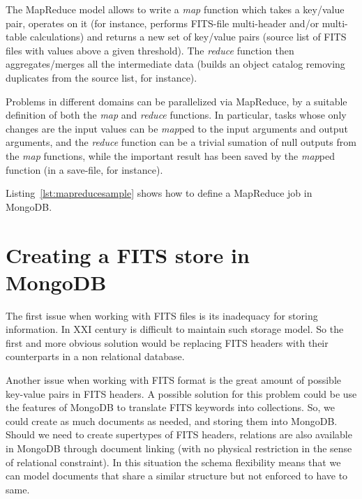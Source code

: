 The MapReduce model allows to write a \emph{map} function which takes a key/value pair, operates on it
(for instance, performs FITS-file multi-header and/or multi-table calculations)
and returns a new set of key/value pairs
(source list of FITS files with values above a given threshold). %
The \emph{reduce} function then aggregates/merges all the intermediate data (builds an object catalog removing duplicates from the source list, for instance).

Problems in different domains can be parallelized via MapReduce, by a suitable definition of both the \emph{map} and \emph{reduce} functions. In particular, tasks whose only changes are the input values can be \emph{map}ped to the input arguments and output arguments, and the \emph{reduce} function can be a trivial sumation of null outputs from the \emph{map} functions, while the important result has been saved by the \emph{map}ped function (in a save-file, for instance).


Listing~\ref{lst:mapreducesample} shows how to define a MapReduce job in MongoDB.






\section{Creating a FITS store in MongoDB} %
\label{sec:creating_a_fits_store_in_mongodb}

The first issue when working with FITS files is its inadequacy for storing information. In XXI century is difficult to maintain such storage model. So the first and more obvious solution would be replacing FITS headers with their counterparts in a non relational database. 

Another issue when working with FITS format is the great amount of possible key-value pairs in FITS headers. A possible solution for this problem could be use the features of MongoDB to translate FITS keywords into collections. So, we could create as much documents as needed, and storing them into MongoDB. Should we need to create supertypes of FITS headers, relations are also available in MongoDB through document linking (with no physical restriction in the sense of relational constraint). In this situation the schema flexibility means that we can model documents that share a similar structure but not enforced to have to same.

